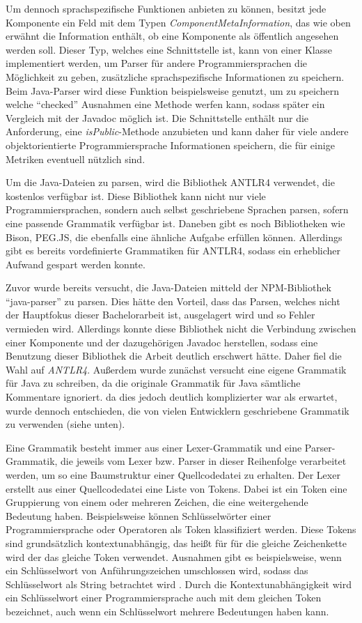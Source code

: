 Um dennoch sprachspezifische Funktionen anbieten zu können, besitzt jede Komponente ein Feld mit dem Typen \textit{ComponentMetaInformation}, das wie oben erwähnt die Information enthält, ob eine Komponente als öffentlich angesehen werden soll. Dieser Typ, welches eine Schnittstelle ist, kann von einer Klasse implementiert werden, um Parser für andere Programmiersprachen die Möglichkeit zu geben, zusätzliche sprachspezifische Informationen zu speichern. Beim Java-Parser wird diese Funktion beispielsweise genutzt, um zu speichern welche \enquote{checked} Ausnahmen eine Methode werfen kann, sodass später ein Vergleich mit der Javadoc möglich ist. Die Schnittstelle enthält nur die Anforderung, eine \textit{isPublic}-Methode anzubieten und kann daher für viele andere objektorientierte Programmiersprache Informationen speichern, die für einige Metriken eventuell nützlich sind. 

Um die Java-Dateien zu parsen, wird die Bibliothek ANTLR4 verwendet, die kostenlos verfügbar ist. Diese Bibliothek kann nicht nur viele Programmiersprachen, sondern auch selbst geschriebene Sprachen parsen, sofern eine passende Grammatik verfügbar ist. Daneben gibt es noch Bibliotheken wie Bison, PEG.JS, die ebenfalls eine ähnliche Aufgabe erfüllen können. Allerdings gibt es bereits vordefinierte Grammatiken für ANTLR4, sodass ein erheblicher Aufwand gespart werden konnte.  

Zuvor wurde bereits versucht, die Java-Dateien mitteld der NPM-Bibliothek \enquote{java-parser} \cite{Java-parser} zu parsen. Dies hätte den Vorteil, dass das Parsen, welches nicht der Hauptfokus dieser Bachelorarbeit ist, ausgelagert wird und so Fehler vermieden wird. Allerdings konnte diese Bibliothek nicht die Verbindung zwischen einer Komponente und der dazugehörigen Javadoc herstellen, sodass eine Benutzung dieser Bibliothek die Arbeit deutlich erschwert hätte. Daher fiel die Wahl auf \textit{ANTLR4}. Außerdem wurde zunächst versucht eine eigene Grammatik für Java zu schreiben, da die originale Grammatik für Java sämtliche Kommentare ignoriert. da dies jedoch deutlich komplizierter war als erwartet, wurde dennoch entschieden, die von vielen Entwicklern geschriebene Grammatik zu verwenden (siehe unten). 

Eine Grammatik besteht immer aus einer Lexer-Grammatik und eine Parser-Grammatik, die jeweils vom Lexer bzw. Parser in dieser Reihenfolge verarbeitet werden, um so eine Baumstruktur einer Quellcodedatei zu erhalten. Der Lexer erstellt aus einer Quellcodedatei eine Liste von Tokens. Dabei ist ein Token eine Gruppierung von einem oder mehreren Zeichen, die eine weitergehende Bedeutung haben. Beispielsweise können Schlüsselwörter einer Programmiersprache oder Operatoren als Token klassifiziert werden. Diese Tokens sind grundsätzlich kontextunabhängig, das heißt für für die gleiche Zeichenkette wird der das gleiche Token verwendet. Ausnahmen gibt es beispielsweise, wenn ein Schlüsselwort von Anführungszeichen umschlossen wird, sodass das Schlüsselwort als String betrachtet wird . Durch die Kontextunabhängigkeit wird ein Schlüsselwort einer Programmiersprache auch mit dem gleichen Token bezeichnet, auch wenn ein Schlüsselwort mehrere Bedeutungen haben kann.  

